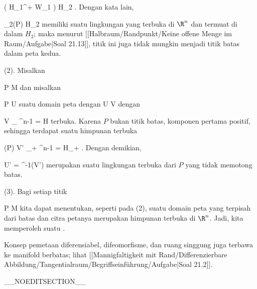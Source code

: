 {{\mavergleichskette
{\vergleichskette
{ \tilde{\varphi} \left(  H_1^+ \cap W_1  \right)
}
{ \subseteq }{ H_2
}
{  }{
}
{    }{
}
{   }{
}
}
{}{}{.}
Dengan kata lain,

\mavergleichskette
{\vergleichskette
{ \alpha_2(P)
}
{ \in }{ H_2
}
{  }{
}
{    }{
}
{   }{
}
}
{}{}{}
memiliki suatu lingkungan yang terbuka di $\R^n$ dan termuat di dalam $H_2$; maka menurut [[Halbraum/Randpunkt/Keine offene Menge im Raum/Aufgabe|Soal 21.13]], titik ini juga tidak mungkin menjadi titik batas dalam peta kedua.}
{}
\teilbeweis {}{}{}
{(2). Misalkan

\mavergleichskette
{\vergleichskette
{ P
}
{ \notin }{ \partial M
}
{  }{
}
{    }{
}
{   }{
}
}
{}{}{}
dan misalkan

\mavergleichskette
{\vergleichskette
{ P
}
{ \in }{ U
}
{  }{
}
{    }{
}
{   }{
}
}
{}{}{}
suatu domain peta dengan
\maabbdisp {\alpha} { U } { V
} {}
dengan

\mavergleichskette
{\vergleichskette
{ V
}
{ \subseteq }{ \R_{} \times \R^{n-1}
}
{ = }{ H
}
{    }{
}
{   }{
}
}
{}{}{}
terbuka. Karena $P$ bukan titik batas, komponen pertama
 positif, sehingga terdapat suatu himpunan terbuka

\mavergleichskette
{\vergleichskette
{ \alpha(P)
}
{ \in }{ V'
}
{ \subseteq }{ \R_{+} \times \R^{n-1}
}
{ =   }{ H_+
}
{   }{
}
}
{}{}{.}
Dengan demikian,

\mavergleichskette
{\vergleichskette
{ U'
}
{ = }{ \alpha^{-1}(V')
}
{  }{
}
{    }{
}
{   }{
}
}
{}{}{}
merupakan suatu lingkungan terbuka dari $P$ yang
 {} {}
tidak memotong batas.}
{}
\teilbeweis {}{}{}
{(3). Bagi setiap titik

\mavergleichskette
{\vergleichskette
{ P
}
{ \notin }{ \partial M
}
{  }{
}
{    }{
}
{   }{
}
}
{}{}{}
kita dapat menentukan, seperti pada (2), suatu domain peta yang terpisah dari batas dan citra petanya merupakan himpunan terbuka di $\R^n$. Jadi, kita memperoleh suatu
 {} {.}}
{}

}

Konsep pemetaan diferensiabel, difeomorfisme, dan ruang singgung juga terbawa ke manifold berbatas; lihat
[[Mannigfaltigkeit mit Rand/Differenzierbare Abbildung/Tangentialraum/Begriffseinführung/Aufgabe|Soal 21.2]].

__NOEDITSECTION__

